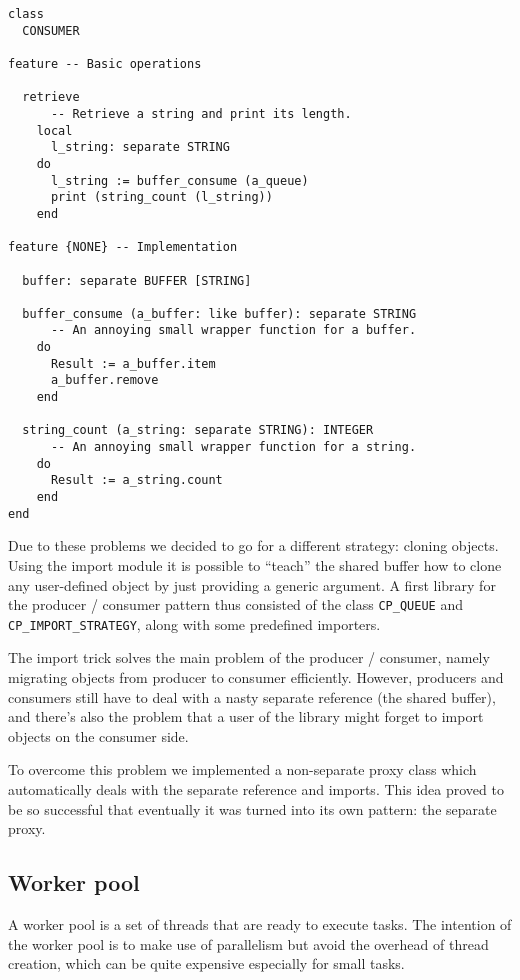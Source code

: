 \documentclass[a4paper,10pt]{report}
\begin{document}
\begin{lstlisting}
class
  CONSUMER

feature -- Basic operations
  
  retrieve
      -- Retrieve a string and print its length.
    local
      l_string: separate STRING
    do
      l_string := buffer_consume (a_queue)
      print (string_count (l_string))
    end
    
feature {NONE} -- Implementation
  
  buffer: separate BUFFER [STRING]

  buffer_consume (a_buffer: like buffer): separate STRING
      -- An annoying small wrapper function for a buffer.
    do
      Result := a_buffer.item
      a_buffer.remove
    end
    
  string_count (a_string: separate STRING): INTEGER
      -- An annoying small wrapper function for a string.
    do
      Result := a_string.count
    end
end
\end{lstlisting}


Due to these problems we decided to go for a different strategy: cloning objects.
Using the import module it is possible to ``teach'' the shared buffer how to clone any user-defined object by just providing a generic argument.
A first library for the producer / consumer pattern thus consisted of the class \lstinline!CP_QUEUE! and \lstinline!CP_IMPORT_STRATEGY!, along with some predefined importers.

The import trick solves the main problem of the producer / consumer, namely migrating objects from producer to consumer efficiently.
However, producers and consumers still have to deal with a nasty separate reference (the shared buffer), and there's also the problem that a user of the library might forget to import objects on the consumer side.

To overcome this problem we implemented a non-separate proxy class which automatically deals with the separate reference and imports.
This idea proved to be so successful that eventually it was turned into its own pattern: the separate proxy.


\subsection{Worker pool}

A worker pool is a set of threads that are ready to execute tasks.
The intention of the worker pool is to make use of parallelism but avoid the overhead of thread creation, which can be quite expensive especially for small tasks.
\end{document}
